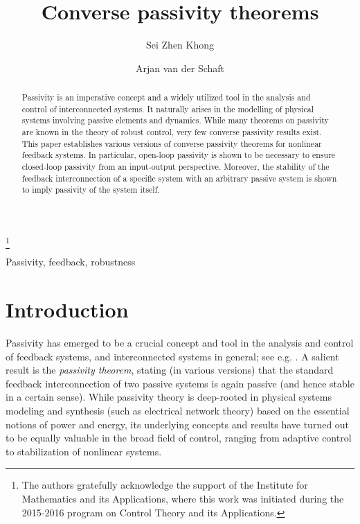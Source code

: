 \documentclass{ifacconf}
\theoremstyle{definition}
\begin{document}
\begin{frontmatter}

  \title{Converse passivity theorems}

  \thanks[footnoteinfo]{The authors gratefully acknowledge the support of the Institute for Mathematics and its Applications, where this work was
    initiated during the 2015-2016 program on Control Theory and its Applications.}

  \author[UMN]{Sei Zhen Khong}    \author[Gro]{Arjan van der Schaft} 

  \address[UMN]{ Institute for Mathematics and its Applications, The University of Minnesota, Minneapolis, MN 55455, USA. (e-mail:
    \texttt{szkhong@umn.edu})}

  \address[Gro]{Johann Bernoulli Institute for Mathematics and Computer Science, University of Groningen, Groningen 9747 AG, Netherlands. (email: \texttt{a.j.van.der.schaft@rug.nl}).}

\begin{keyword}
  Passivity, feedback, robustness
\end{keyword}

\begin{abstract}
  Passivity is an imperative concept and a widely utilized tool in the analysis and control of interconnected systems. It naturally arises in the
  modelling of physical systems involving passive elements and dynamics. While many theorems on passivity are known in the theory of robust control,
  very few converse passivity results exist. This paper establishes various versions of converse passivity theorems for nonlinear feedback systems. In
  particular, open-loop passivity is shown to be necessary to ensure closed-loop passivity from an input-output perspective. Moreover, the
  stability of the feedback interconnection of a specific system with an arbitrary passive system is shown to imply passivity of the system itself.
\end{abstract}

\end{frontmatter}


\section{Introduction}
Passivity has emerged to be a crucial concept and tool in the analysis and control of feedback systems, and interconnected systems in general; see
e.g. \cite{Wil72, MoyHil78, Vid81, MegRan97, Sch16}. A salient result is the {\it passivity theorem}, stating (in various versions) that the standard feedback
interconnection of two passive systems is again passive (and hence stable in a certain sense). While passivity theory is deep-rooted in physical
systems modeling and synthesis (such as electrical network theory) based on the essential notions of power and energy, its underlying concepts and
results have turned out to be equally valuable in the broad field of control, ranging from adaptive control to stabilization of nonlinear systems.
\end{document}
